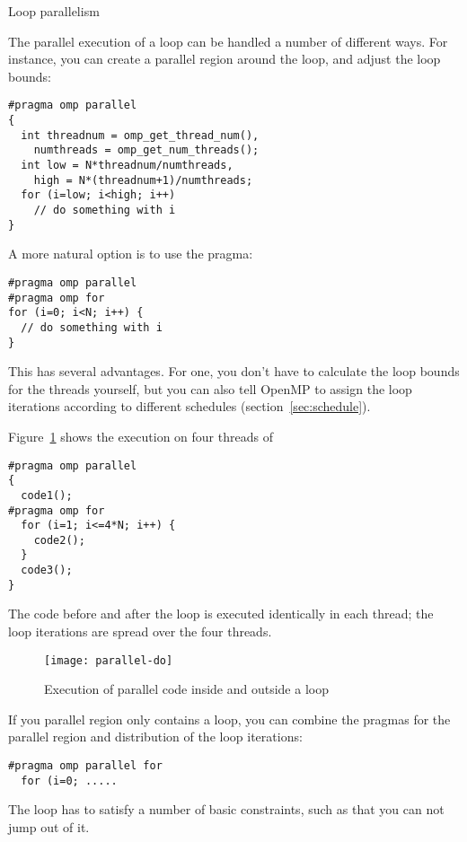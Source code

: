  {Loop parallelism}

The parallel execution of a loop can be handled a number of different ways.
For instance, you can create a parallel region around the loop, and
adjust the loop bounds:
\begin{verbatim}
#pragma omp parallel
{
  int threadnum = omp_get_thread_num(),
    numthreads = omp_get_num_threads();
  int low = N*threadnum/numthreads,
    high = N*(threadnum+1)/numthreads;
  for (i=low; i<high; i++)
    // do something with i
}
\end{verbatim}

A more natural option is to use the
 pragma:
\begin{verbatim}
#pragma omp parallel
#pragma omp for
for (i=0; i<N; i++) {
  // do something with i
}
\end{verbatim}
This has several advantages. For one, you don't have to calculate the loop bounds
for the threads yourself, but you can also tell OpenMP to assign the loop
iterations according to different schedules (section~\ref{sec:schedule}).

Figure~\ref{fig:omp-par-do} shows the execution on four threads of
\begin{verbatim}
#pragma omp parallel
{
  code1();
#pragma omp for
  for (i=1; i<=4*N; i++) {
    code2();
  }
  code3();
}
\end{verbatim}
The code before and after the loop is executed identically
in each thread; the loop iterations are spread over the four threads.
\begin{figure}[ht]
  \texttt{[image: parallel-do]}
  \caption{Execution of parallel code inside and outside a loop}
  \label{fig:omp-par-do}
\end{figure}

If you parallel region only contains a loop, you can combine the
pragmas for the parallel region and distribution of the loop iterations:
\begin{verbatim}
#pragma omp parallel for
  for (i=0; .....
\end{verbatim}

The loop has to satisfy a number of basic constraints, such as that you can not
jump out of it.

